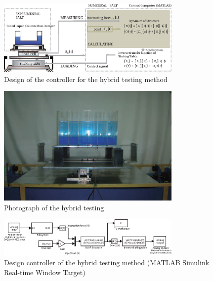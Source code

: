 \begin{figure}[ht]
\centering
\includegraphics[width=0.8\textwidth] {figure/5-16.eps}
\caption{Design of the controller for the hybrid testing method}
\label{fig:5-16}
\end{figure}

\begin{figure}[ht]
\centering
\includegraphics[width=0.8\textwidth] {figure/5-17.eps}
\caption{Photograph of the hybrid testing}
\label{fig:5-17}
\end{figure}

\begin{figure}[ht]
\centering
\includegraphics[width=0.8\textwidth] {figure/5-18.eps}
\caption{Design controller of the hybrid testing method (MATLAB Simulink Real-time Window Target)}
\label{fig:5-18}
\end{figure}








\clearpage

